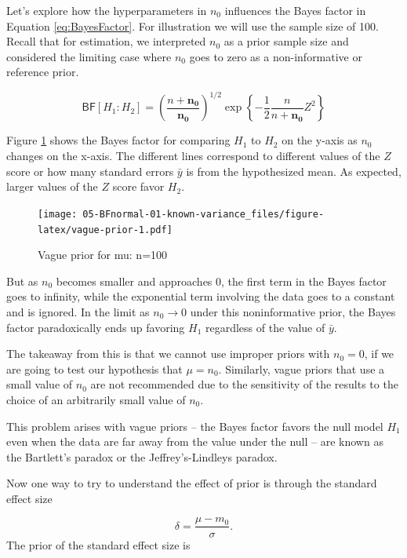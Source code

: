 \documentclass[]{book}
\theoremstyle{definition}
\theoremstyle{definition}
\theoremstyle{definition}
\theoremstyle{remark}
\begin{document}
Let's explore how the hyperparameters in \(n_0\) influences the Bayes
factor in Equation \eqref{eq:BayesFactor}. For illustration we will use
the sample size of 100. Recall that for estimation, we interpreted
\(n_0\) as a prior sample size and considered the limiting case where
\(n_0\) goes to zero as a non-informative or reference prior.

\begin{equation}
\textsf{BF}[H_1 : H_2] = \left(\frac{n + \mathbf{n_0}}{\mathbf{n_0}}\right)^{1/2} \exp\left\{-\frac{1}{2} \frac{n }{n + \mathbf{n_0}} Z^2 \right\}
\label{eq:BayesFactor}
\end{equation}

Figure \ref{fig:vague-prior} shows the Bayes factor for comparing
\(H_1\) to \(H_2\) on the y-axis as \(n_0\) changes on the x-axis. The
different lines correspond to different values of the \(Z\) score or how
many standard errors \(\bar{y}\) is from the hypothesized mean. As
expected, larger values of the \(Z\) score favor \(H_2\).

\begin{figure}[htbp]
\centering
\texttt{[image: 05-BFnormal-01-known-variance\_files/figure-latex/vague-prior-1.pdf]}
\caption{\label{fig:vague-prior}Vague prior for mu: n=100}
\end{figure}

But as \(n_0\) becomes smaller and approaches 0, the first term in the
Bayes factor goes to infinity, while the exponential term involving the
data goes to a constant and is ignored. In the limit as
\(n_0 \rightarrow 0\) under this noninformative prior, the Bayes factor
paradoxically ends up favoring \(H_1\) regardless of the value of
\(\bar{y}\).

The takeaway from this is that we cannot use improper priors with
\(n_0 = 0\), if we are going to test our hypothesis that \(\mu = n_0\).
Similarly, vague priors that use a small value of \(n_0\) are not
recommended due to the sensitivity of the results to the choice of an
arbitrarily small value of \(n_0\).

This problem arises with vague priors -- the Bayes factor favors the
null model \(H_1\) even when the data are far away from the value under
the null -- are known as the Bartlett's paradox or the
Jeffrey's-Lindleys paradox.

Now one way to try to understand the effect of prior is through the
standard effect size

\[\delta = \frac{\mu - m_0}{\sigma}.\] The prior of the standard effect
size is
\end{document}
